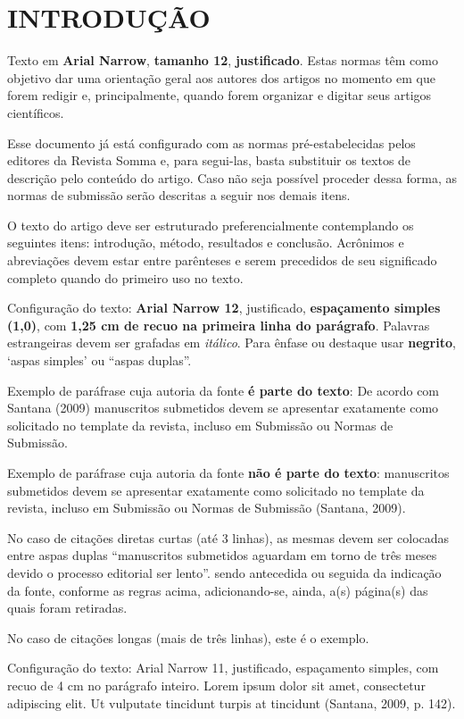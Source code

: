 
\section{INTRODUÇÃO}

Texto em \textbf{Arial Narrow}, \textbf{tamanho 12}, \textbf{justificado}. Estas normas têm como objetivo dar uma orientação geral aos autores dos artigos no momento em que forem redigir e, principalmente, quando forem organizar e digitar seus artigos científicos.

Esse documento já está configurado com as normas pré-estabelecidas pelos editores da Revista Somma e, para segui-las, basta substituir os textos de descrição pelo conteúdo do artigo. Caso não seja possível proceder dessa forma, as normas de submissão serão descritas a seguir nos demais itens.

O texto do artigo deve ser estruturado preferencialmente contemplando os seguintes itens: introdução, método, resultados e conclusão. Acrônimos e abreviações devem estar entre parênteses e serem precedidos de seu significado completo quando do primeiro uso no texto.

Configuração do texto: \textbf{Arial Narrow 12}, justificado, \textbf{espaçamento simples (1,0)}, com \textbf{1,25 cm de recuo na primeira linha do parágrafo}. Palavras estrangeiras devem ser grafadas em \textit{itálico}. Para ênfase ou destaque usar \textbf{negrito}, `aspas simples' ou ``aspas duplas''.

Exemplo de paráfrase cuja autoria da fonte \textbf{é parte do texto}: De acordo com Santana (2009) manuscritos submetidos devem se apresentar exatamente como solicitado no template da revista, incluso em Submissão ou Normas de Submissão.

Exemplo de paráfrase cuja autoria da fonte \textbf{não é parte do texto}: manuscritos submetidos devem se apresentar exatamente como solicitado no template da revista, incluso em Submissão ou Normas de Submissão (Santana, 2009).

No caso de citações diretas curtas (até 3 linhas), as mesmas devem ser colocadas entre aspas duplas ``manuscritos submetidos aguardam em torno de três meses devido o processo editorial ser lento''. sendo antecedida ou seguida da indicação da fonte, conforme as regras acima, adicionando-se, ainda, a(s) página(s) das quais foram retiradas.

No caso de citações longas (mais de três linhas), este é o exemplo. 
\begin{citacao}
Configuração do texto: Arial Narrow 11, justificado, espaçamento simples, com recuo de 4 cm no parágrafo inteiro. Lorem ipsum dolor sit amet, consectetur adipiscing elit. Ut vulputate tincidunt turpis at tincidunt (Santana, 2009, p. 142).
\end{citacao}

